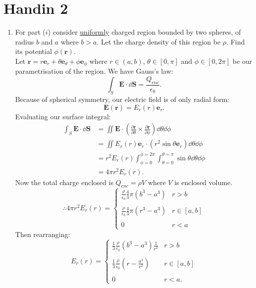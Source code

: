 \pagestyle{fancy}
\fancyhead{}

\section{Handin 2}
\begin{enumerate}
    \item For part ($i$) consider \underline{uniformly} charged
    region bounded by two spheres, of radius $b$ and $a$
    where $b>a$. Let the charge density of this region be $\rho$.
    Find its potential $\phi(\boldsymbol{r})$. \\

    Let $\boldsymbol{r}=r\boldsymbol{e}_r
    +\theta\boldsymbol{e}_{\theta}
    +\phi\boldsymbol{e}_{\phi}$
    where $r\in(a,b)$, $\theta\in[0,\pi]$
    and $\phi\in[0,2\pi]$
    be our parametrisation of the region.
    We have Gauss's law:
    $$\int_S\boldsymbol{E}\cdot\dd\boldsymbol{S}
    =\frac{Q_{enc}}{\epsilon_0}.$$
    Because of spherical symmetry,
    our electric field is of only radial form:
    $$\boldsymbol{E}(\boldsymbol{r})
    =E_r(r)\boldsymbol{e}_r.$$
    Evaluating our surface integral:
    \begin{align*}
        \int_S\boldsymbol{E}\cdot\dd\boldsymbol{S}
        &=\iint\boldsymbol{E}\cdot
        \left(\frac{\partial\boldsymbol{r}}{\partial\theta}\times
        \frac{\partial\boldsymbol{r}}{\partial\phi}\right)
        \dd\theta\dd\phi \\
        &=\iint E_r(r)\boldsymbol{e}_r\cdot
        (r^2\sin\theta\boldsymbol{e}_r)\dd\theta\dd\phi \\
        &=r^2E_r(r)\int_{\phi=0}^{\phi=2\pi}
        \int_{\theta=0}^{\theta=\pi}
        \sin\theta\dd\theta\dd\phi \\
        &=4\pi r^2E_r(r).
    \end{align*}
    Now the total charge enclosed is $Q_{enc}=\rho V$
    where $V$ is enclosed volume.
    $$\therefore 4\pi r^2E_r(r)=
    \left\{
	\begin{array}{ll}
        \displaystyle\frac{\rho}{\epsilon_0}\frac{4}{3}\pi
        (b^3-a^3) 
        & \mbox{$r>b$} \\\\
		\displaystyle\frac{\rho}{\epsilon_0}
        \frac{4}{3}\pi(r^3-a^3) 
        & \mbox{$r\in[a,b]$} \\\\
		0 
        & \mbox{$r<a$}
	\end{array}
    \right.$$
    Then rearranging:
    $$E_r(r)=
    \left\{
	\begin{array}{ll}
        \displaystyle\frac{1}{3}
        \frac{\rho}{\epsilon_0}(b^3-a^3)
        \frac{1}{r^2}
        & \mbox{$r>b$} \\\\
		\displaystyle\frac{1}{3}
        \frac{\rho}{\epsilon_0}
        \left(r-\frac{a^3}{r^2}\right)
        & \mbox{$r\in[a,b]$} \\\\
		0 
        & \mbox{$r<a$.}
	\end{array}
    \right.$$


\end{enumerate}
